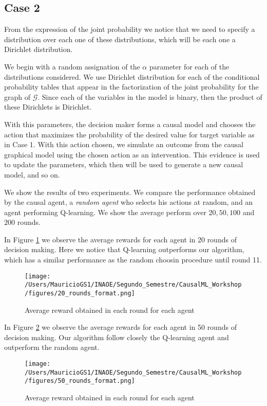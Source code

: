 \documentclass{article}
\begin{document}
\subsection{Case 2}
From the expression of the joint probability we notice that we need to specify a distribution over each one of these distributions, which will be each one a Dirichlet distribution.

We begin with a random assignation of the $\alpha$ parameter for each of the distributions considered. We use Dirichlet distribution for each of the conditional probability tables that appear in the factorization of the joint probability for the graph of $\mathcal{G}$. Since each of the variables in the model is binary, then the product of these Dirichlets is Dirichlet.

With this parameters, the decision maker forms a causal model and chooses the action that maximizes the probability of the desired value for target variable as in Case 1.  With this action chosen, we simulate an outcome from the causal graphical model using the chosen action as an intervention. This evidence is used to update the parameters, which then will be used to generate a new causal model, and so on.

We show the results of two experiments. We compare the performance obtained by the causal agent, a \textit{random agent} who selects his actions at random, and an agent performing Q-learning. We show the average perform over $20, 50, 100$ and $200$ rounds.

In Figure \ref{20_rounds} we observe the average rewards for each agent in 20 rounds of decision making. Here we notice that Q-learning outperforms our algorithm, which has a similar performance as the random choosin procedure until round 11.

\begin{figure}[ht]
\vskip 0.2in
\begin{center}
\centerline{\texttt{[image: /Users/MauricioGS1/INAOE/Segundo\_Semestre/CausalML\_Workshop/figures/20\_rounds\_format.png]}}
\caption{Average reward obtained in each round for each agent}
\label{20_rounds}
\end{center}
\vskip -0.2in
\end{figure}


In Figure \ref{50_rounds} we observe the average rewards for each agent in 50 rounds of decision making. Our algorithm follow closely the Q-learning agent and outperform the random agent.

\begin{figure}[ht]
\vskip 0.2in
\begin{center}
\centerline{\texttt{[image: /Users/MauricioGS1/INAOE/Segundo\_Semestre/CausalML\_Workshop/figures/50\_rounds\_format.png]}}
\caption{Average reward obtained in each round for each agent}
\label{50_rounds}
\end{center}
\vskip -0.2in
\end{figure}
\end{document}
